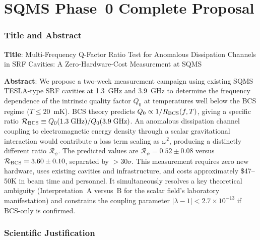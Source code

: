 \documentclass[11pt]{article}
\theoremstyle{definition}
\theoremstyle{remark}
\begin{document}
\part{SQMS Phase~0 Complete Proposal}
\label{part:phase0}


\section{Title and Abstract}

\begin{tcolorbox}[colback=white, colframe=black, title=\textbf{Proposal}]

\textbf{Title}: Multi-Frequency Q-Factor Ratio Test for Anomalous
Dissipation Channels in SRF Cavities: A Zero-Hardware-Cost Measurement
at SQMS

\medskip

\textbf{Abstract}: We propose a two-week measurement campaign using
existing SQMS TESLA-type SRF cavities at 1.3~GHz and 3.9~GHz to
determine the frequency dependence of the intrinsic quality factor
$Q_0$ at temperatures well below the BCS regime ($T \leq 20$~mK).
BCS theory predicts $Q_0 \propto 1/R_{\rm BCS}(f, T)$, giving a
specific ratio $\mathcal{R}_{\rm BCS} \equiv Q_0(1.3\;\text{GHz})/
Q_0(3.9\;\text{GHz})$. An anomalous dissipation channel coupling to
electromagnetic energy density through a scalar gravitational
interaction would contribute a loss term scaling as $\omega^2$,
producing a distinctly different ratio $\mathcal{R}_\psi$. The
predicted values are $\mathcal{R}_\psi = 0.52 \pm 0.08$ versus
$\mathcal{R}_{\rm BCS} = 3.60 \pm 0.10$, separated by $>30\sigma$.
This measurement requires zero new hardware, uses existing cavities
and infrastructure, and costs approximately \$47--50K in beam time
and personnel. It simultaneously resolves a key theoretical ambiguity
(Interpretation~A versus~B for the scalar field's laboratory
manifestation) and constrains the coupling parameter $|\lambda - 1|
< 2.7 \times 10^{-13}$ if BCS-only is confirmed.

\end{tcolorbox}


\section{Scientific Justification}
\end{document}
